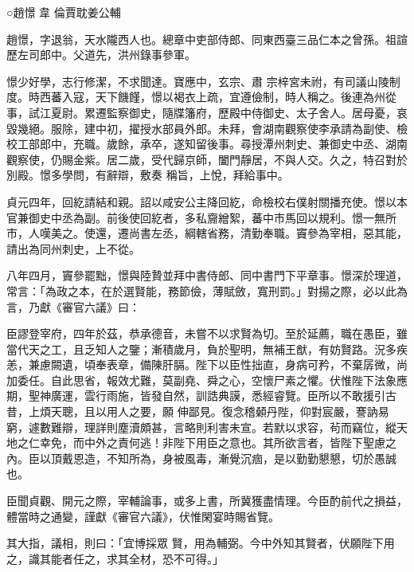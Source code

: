 
\begin{pinyinscope}

 ○趙憬
 韋
 倫賈耽姜公輔



 趙憬，字退翁，天水隴西人也。總章中吏部侍郎、同東西臺三品仁本之曾孫。祖諠歷左司郎中。父道先，洪州錄事參軍。



 憬少好學，志行修潔，不求聞達。寶應中，玄宗、肅
 宗梓宮未祔，有司議山陵制度。時西蕃入寇，天下饑饉，憬以褐衣上疏，宜遵儉制，時人稱之。後連為州從事，試江夏尉。累遷監察御史，隨牒籓府，歷殿中侍御史、太子舍人。居母憂，哀毀幾絕。服除，建中初，擢授水部員外郎。未拜，會湖南觀察使李承請為副使、檢校工部郎中，充職。歲餘，承卒，遂知留後事。尋授潭州刺史、兼御史中丞、湖南觀察使，仍賜金紫。居二歲，受代歸京師，闔門靜居，不與人交。久之，特召對於別殿。憬多學問，有辭辯，敷奏
 稱旨，上悅，拜給事中。



 貞元四年，回紇請結和親。詔以咸安公主降回紇，命檢校右僕射關播充使。憬以本官兼御史中丞為副。前後使回紇者，多私齎繒絮，蕃中市馬回以規利。憬一無所市，人嘆美之。使還，遷尚書左丞，綱轄省務，清勤奉職。竇參為宰相，惡其能，請出為同州刺史，上不從。



 八年四月，竇參罷黜，憬與陸贄並拜中書侍郎、同中書門下平章事。憬深於理道，常言：「為政之本，在於選賢能，務節儉，薄賦斂，寬刑罰。」對揚之際，必以此為
 言，乃獻《審官六議》曰：



 臣謬登宰府，四年於茲，恭承德音，未嘗不以求賢為切。至於延薦，職在愚臣，雖當代天之工，且乏知人之鑒；漸積歲月，負於聖明，無補王猷，有妨賢路。況多疾恙，兼慮闕遺，頃奉表章，備陳肝膈。陛下以臣性拙直，身病可矜，不棄孱微，尚加委任。自此思省，報效尤難，莫副堯、舜之心，空懷尸素之懼。伏惟陛下法象應期，聖神廣運，雲行雨施，皆發自然，訓誥典謨，悉經睿覽。臣所以不敢援引古昔，上煩天聰，且以用人之要，願
 伸鄙見。復念稽顙丹陛，仰對宸嚴，謇訥易窮，遽數難辯，理詳則塵瀆頗甚，言略則利害未宣。若默以求容，茍而竊位，縱天地之仁幸免，而中外之責何逃！非陛下用臣之意也。其所欲言者，皆陛下聖慮之內。臣以頂戴恩造，不知所為，身被風毒，漸覺沉痼，是以勤勤懇懇，切於愚誠也。



 臣聞貞觀、開元之際，宰輔論事，或多上書，所冀獲盡情理。今臣酌前代之損益，體當時之通變，謹獻《審官六議》，伏惟閑宴時賜省覽。



 其大指，議相，則曰：「宜博採眾
 賢，用為輔弼。今中外知其賢者，伏願陛下用之，識其能者任之，求其全材，恐不可得。」




\end{pinyinscope}
